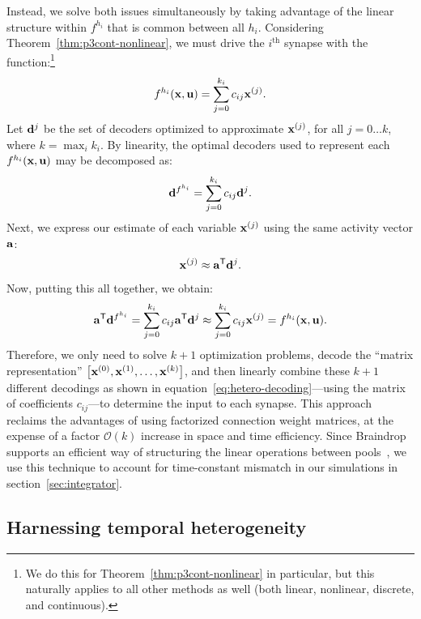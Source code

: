 Instead, we solve both issues simultaneously by taking advantage of the linear structure within $f^{h_i}$ that is common between all $h_i$.
Considering Theorem~\ref{thm:p3cont-nonlinear}, we must drive the $i^\text{th}$ synapse with the function:\footnote{%
We do this for Theorem~\ref{thm:p3cont-nonlinear} in particular, but this naturally applies to all other methods as well (both linear, nonlinear, discrete, and continuous).}
\begin{equation*}
f^{h_i}(\mathbf{x}, \mathbf{u}) = \sum_{j=0}^{k_i} c_{ij} \mathbf{x}^{(j)} \text{.}
\end{equation*}
Let $\mathbf{d}^j$ be the set of decoders optimized to approximate $\mathbf{x}^{(j)}$, for all $j = 0 \ldots k$, where $k = \max_i k_i$.
By linearity, the optimal decoders used to represent each $f^{h_i}(\mathbf{x}, \mathbf{u})$ may be decomposed as:
\begin{equation*}
\mathbf{d}^{f^{h_i}} = \sum_{j=0}^{k_i} c_{ij} \mathbf{d}^j \text{.}
\end{equation*}
Next, we express our estimate of each variable $\mathbf{x}^{(j)}$ using the same activity vector $\mathbf{a}$:
\begin{align*}
\mathbf{x}^{(j)} \approx {\mathbf{a}}^\mathsf{T}{\mathbf{d}^j} \text{.}
\end{align*}
Now, putting this all together, we obtain:
\begin{equation} \label{eq:hetero-decoding}
{\mathbf{a}}^\mathsf{T}{\mathbf{d}^{f^{h_i}}} = \sum_{j=0}^{k_i} c_{ij} {\mathbf{a}}^\mathsf{T}{\mathbf{d}^j} \approx \sum_{j=0}^{k_i} c_{ij} \mathbf{x}^{(j)} = f^{h_i}(\mathbf{x}, \mathbf{u}) \text{.}
\end{equation}
Therefore, we only need to solve $k+1$ optimization problems, decode the ``matrix representation'' $\left[ \mathbf{{x}}^{(0)}, \mathbf{{x}}^{(1)}, \ldots, \mathbf{{x}}^{(k)} \right]$, and then linearly combine these $k+1$ different decodings as shown in equation~\ref{eq:hetero-decoding}---using the matrix of coefficients $c_{ij}$---to determine the input to each synapse.
This approach reclaims the advantages of using factorized connection weight matrices, at the expense of a factor $\mathcal{O}(k)$ increase in space and time efficiency.
Since Braindrop supports an efficient way of structuring the linear operations between pools~\citep[][Figure~5]{braindrop2019}, we use this technique to account for time-constant mismatch in our simulations in section~\ref{sec:integrator}.

\subsection{Harnessing temporal heterogeneity}
\label{sec:temporal-heterogeneity}

